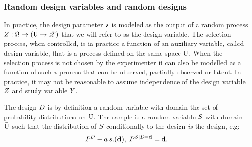 %
%
%
%
%
%


\subsubsection{Random design variables and random designs}
In practice, the design parameter $\mathbf{z}$ is modeled as the output of a random process $Z:\Omega\to(\mathrm{U}\to \mathscr{Z})$ that we will refer to as the design variable.
The selection process, when controlled, is in practice a function of an auxiliary variable, called design variable, that is a process defined on the same space $\mathrm{U}$. When the selection process is not chosen by the experimenter it can also be modelled as a function of such a process that can be observed, partially observed or latent. In practice, it may not be reasonable to assume independence of the design variable  $Z$ and study variable $Y$.


The design $D$ is by definition a random variable with domain the set of probability distributions on  $\bar{\mathrm{U}}$. The sample is a random variable $S$ with domain $\bar{\mathrm{U}}$ such that the distribution of $S$ conditionally to the design \emph{is} the design, e.g:
\begin{equation}P^D-a.s.(\mathbf{d}),~P^{S\mid D=\mathbf{d}}=\mathbf{d}.\end{equation}

